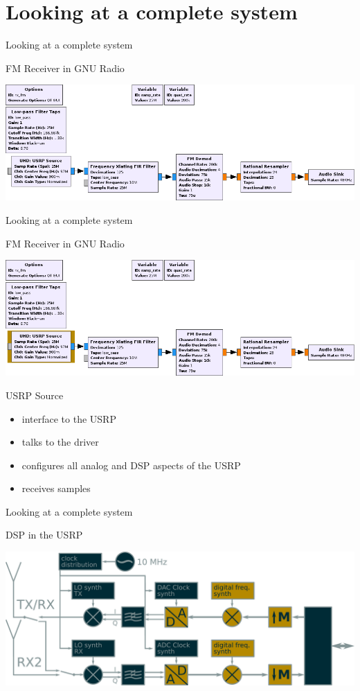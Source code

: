 \documentclass{beamer}
\begin{document}
\section{Looking at a complete system}
\begin{frame}{Looking at a complete system}

  FM Receiver in GNU Radio \bigskip

  {\includegraphics[width=\textwidth]{fg}}



\end{frame}
\begin{frame}{Looking at a complete system}

  FM Receiver in GNU Radio \bigskip


  {\includegraphics[width=\textwidth]{fg_usrp_source}}

  USRP Source

  \begin{itemize}
    \item interface to the USRP
    \item talks to the driver
    \item configures all analog and DSP aspects of the USRP
    \item receives samples
  \end{itemize}


\end{frame}
\begin{frame}{Looking at a complete system}

  DSP in the USRP \bigskip


  {\includegraphics[width=\textwidth]{b200}}

\end{frame}
\end{document}
